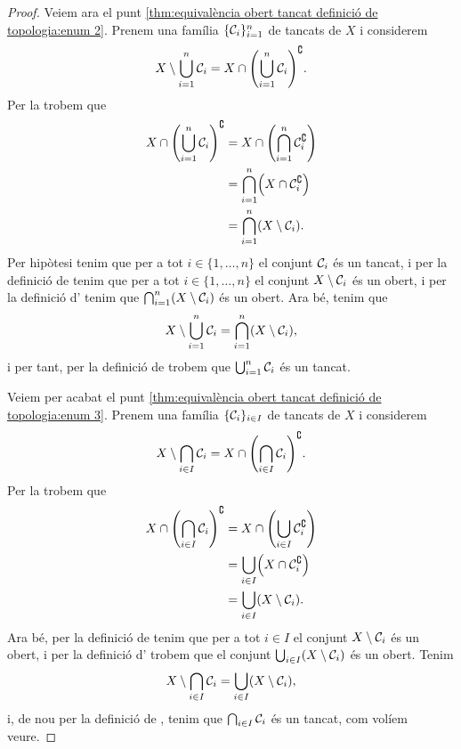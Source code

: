 \documentclass[../../Main.tex]{subfiles}
\begin{document}
\begin{theorem}
\begin{proof}
			Veiem ara el punt \eqref{thm:equivalència obert tancat definició de topologia:enum 2}. Prenem una família \(\{\mathcal{C}_{i}\}_{i=1}^{n}\) de tancats de \(X\) i considerem
			\[
			    X\setminus\bigcup_{i=1}^{n}\tancat{C}_{i}=X\cap\left(\bigcup_{i=1}^{n}\tancat{C}_{i}\right)^{\complement}.
			\]
			Per la  trobem que
			\begin{align*}
				X\cap\left(\bigcup_{i=1}^{n}\tancat{C}_{i}\right)^{\complement}&=X\cap\left(\bigcap_{i=1}^{n}\tancat{C}_{i}^{\complement}\right) \\
				&=\bigcap_{i=1}^{n}\left(X\cap\tancat{C}_{i}^{\complement}\right) \\
				&=\bigcap_{i=1}^{n}\left(X\setminus\tancat{C}_{i}\right).
			\end{align*}
			Per hipòtesi tenim que per a tot \(i\in\{1,\dots,n\}\) el conjunt \(\mathcal{C}_{i}\) és un tancat, i per la definició de  tenim que per a tot \(i\in\{1,\dots,n\}\) el conjunt \(X\setminus\mathcal{C}_{i}\) és un obert, i per la definició d' tenim que \(\bigcap_{i=1}^{n}\left(X\setminus\tancat{C}_{i}\right)\) és un obert. Ara bé, tenim que
			\[
			    X\setminus\bigcup_{i=1}^{n}\tancat{C}_{i}=\bigcap_{i=1}^{n}\left(X\setminus\tancat{C}_{i}\right),
			\]
			i per tant, per la definició de  trobem que \(\bigcup_{i=1}^{n}\mathcal{C}_{i}\) és un tancat.
			
			Veiem per acabat el punt \eqref{thm:equivalència obert tancat definició de topologia:enum 3}. Prenem una família \(\{\mathcal{C}_{i}\}_{i\in I}\) de tancats de \(X\) i considerem
			\[
			    X\setminus\bigcap_{i\in I}\tancat{C}_{i}=X\cap\left(\bigcap_{i\in I}\tancat{C}_{i}\right)^{\complement}.
			\]
			Per la  trobem que
			\begin{align*}
				X\cap\left(\bigcap_{i\in I}\tancat{C}_{i}\right)^{\complement}&=X\cap\left(\bigcup_{i\in I}\tancat{C}_{i}^{\complement}\right) \\
				&=\bigcup_{i\in I}\left(X\cap\tancat{C}_{i}^{\complement}\right) \\
				&=\bigcup_{i\in I}\left(X\setminus\tancat{C}_{i}\right).
			\end{align*}
			Ara bé, per la definició de  tenim que per a tot \(i\in I\) el conjunt \(X\setminus\mathcal{C}_{i}\) és un obert, i per la definició d' trobem que el conjunt \(\bigcup_{i\in I}\left(X\setminus\tancat{C}_{i}\right)\) és un obert. Tenim
			\[
			    X\setminus\bigcap_{i\in I}\tancat{C}_{i}=\bigcup_{i\in I}\left(X\setminus\tancat{C}_{i}\right),
			\]
			i, de nou per la definició de , tenim que \(\bigcap_{i\in I}\mathcal{C}_{i}\) és un tancat, com volíem veure.
		\end{proof}
	\end{theorem}
\end{document}
